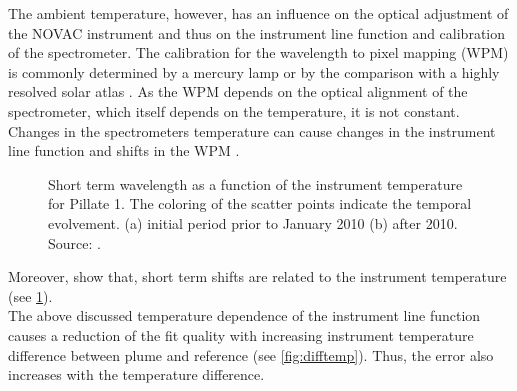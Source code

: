 The ambient temperature, however, has an influence on the optical adjustment of the NOVAC instrument and thus on the instrument line function and calibration of the spectrometer.
The calibration for the wavelength to pixel mapping (WPM) is commonly determined by a mercury lamp or by the comparison with a highly resolved solar atlas \cite{chance2010improved}.
As the WPM depends on the optical alignment of the spectrometer, which itself depends on the temperature, it is not constant.
Changes in the spectrometers temperature can cause changes in the instrument line function and shifts in the WPM \citep{pinardi2007influence}. 
\begin{figure}[h!]        
    \caption{Short term wavelength as a function of the instrument temperature for Pillate 1. The coloring of the scatter points indicate the temporal evolvement. (a) initial period prior to January 2010 (b) after 2010. Source: \cite{WarnachSimon}.}
    \label{fig:shorttermshift}
\end{figure}
Moreover, \cite{WarnachSimon} show that, short term shifts are related to the instrument temperature (see \cref{fig:shorttermshift}).\\
The above discussed temperature dependence of the instrument line function causes a reduction of the fit quality with increasing instrument temperature difference between plume and reference (see \cref{fig:difftemp}). Thus, the  error also increases with the temperature difference.
